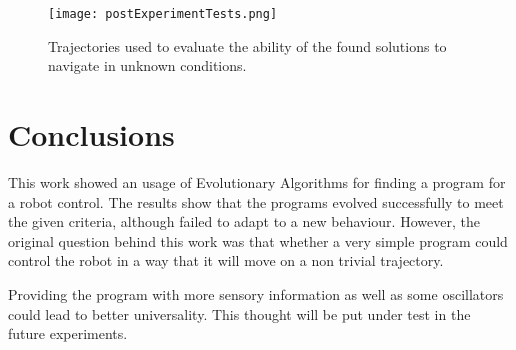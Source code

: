\documentclass{ExcelAtFIT}
\begin{document}
\begin{figure}[t]
	\centering
	{\texttt{[image: postExperimentTests.png]}}
	\caption{
	Trajectories used to evaluate the ability of the found solutions to navigate in unknown conditions.
	}
	\label{fig:PostExperimentTests}
\end{figure}


\section{Conclusions}
\label{sec:Conclusions}

This work showed an usage of Evolutionary Algorithms for finding a program for a robot control.
The results show that the programs evolved successfully to meet the given criteria, although failed to adapt to a new behaviour.
However, the original question behind this work was that whether a very simple program could control the robot in a way that it will move on a non trivial trajectory.

Providing the program with more sensory information as well as some oscillators could lead to better universality.
This thought will be put under test in the future experiments.

%
%
\end{document}
